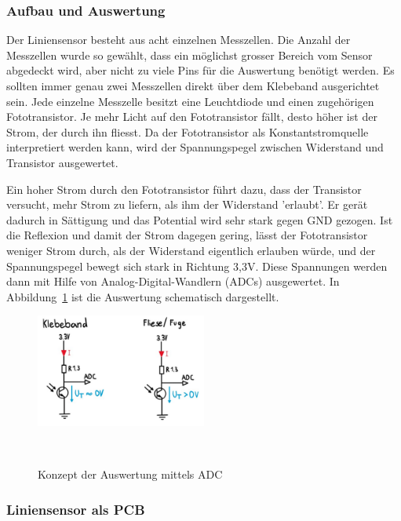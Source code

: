 \documentclass[main.tex]{subfiles} %
\begin{document}
\subsubsection*{Aufbau und Auswertung}
Der Liniensensor besteht aus acht einzelnen Messzellen. Die Anzahl der Messzellen wurde so
gewählt, dass ein möglichst grosser Bereich vom Sensor abgedeckt wird, aber nicht zu viele
Pins für die Auswertung benötigt werden. Es sollten immer genau zwei Messzellen direkt über
dem Klebeband ausgerichtet sein. Jede einzelne Messzelle besitzt eine Leuchtdiode und einen
zugehörigen Fototransistor. Je mehr Licht auf den Fototransistor fällt, desto höher ist der
Strom, der durch ihn fliesst. Da der Fototransistor als Konstantstromquelle interpretiert
werden kann, wird der Spannungspegel zwischen Widerstand und Transistor ausgewertet.

Ein hoher Strom durch den Fototransistor führt dazu, dass der Transistor
versucht, mehr Strom zu liefern, als ihm der Widerstand 'erlaubt'. Er gerät
dadurch in Sättigung und das Potential wird sehr stark gegen GND gezogen. Ist
die Reflexion und damit der Strom dagegen gering, lässt der Fototransistor
weniger Strom durch, als der Widerstand eigentlich erlauben würde, und der
Spannungspegel bewegt sich stark in Richtung 3,3V. Diese Spannungen werden dann
mit Hilfe von Analog-Digital-Wandlern (ADCs) ausgewertet. In
Abbildung~\ref{fig:Auswertung_Liniensensor1} ist die Auswertung schematisch
dargestellt.
\begin{figure}[H]
    \centering
    \includegraphics[width=0.5\textwidth]{fig_Strecke_Tracken/Auswertung_Liniensensor.pdf}
    \caption{Konzept der Auswertung mittels ADC}~\label{fig:Auswertung_Liniensensor1}
\end{figure}


\subsubsection{Liniensensor als PCB}
\end{document}
